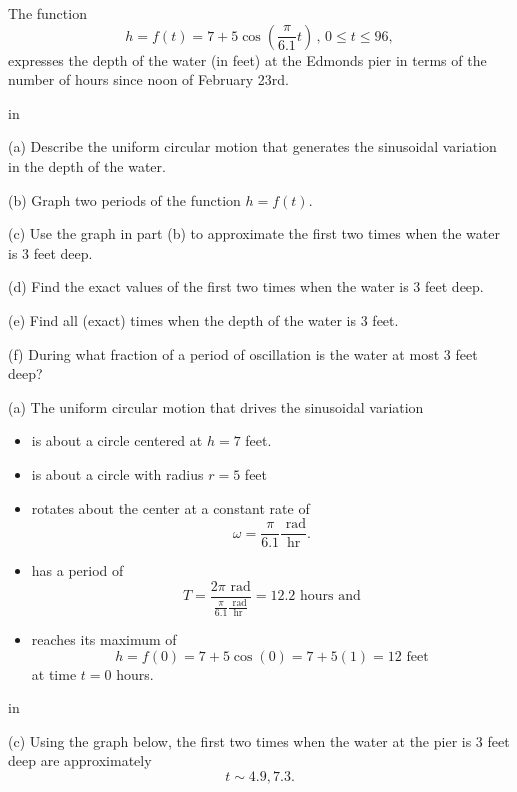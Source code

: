 \documentclass{ximera}
\newcommand{\pskip}{\vskip 0.1 in}
\begin{document}
\begin{example}  \label{Exer67u8gg}
The function
\[
    h  = f(t) = 7 + 5 \cos \left( \frac{\pi}{6.1}t  \right) \, , \, 0\leq t \leq 96 ,
\]
expresses the depth of the water (in feet) at the Edmonds pier in terms of the number of hours since noon of February 23rd.

\pskip

(a) Describe the uniform circular motion that generates the sinusoidal variation in the depth of the water.

(b) Graph two periods of the function $h=f(t)$.

(c) Use the graph in part (b) to approximate the first two times when the water is $3$ feet deep. 

(d) Find the exact values of the first two times when the water is $3$ feet deep.

(e) Find all (exact) times when the depth of the water is $3$ feet.

(f) During what fraction of a period of oscillation is the water at most $3$ feet deep?


\begin{explanation}
(a) The uniform circular motion that drives the sinusoidal variation

\begin{itemize}

\item{is about a circle centered at $h=7$ feet.}

\item{is about a circle with radius $r=5$ feet}

\item{rotates about the center at a constant rate of 
\[
     \omega = \frac{\pi}{6.1} \frac{ \text{ rad}}{\text{hr}} .
\]}

\item{has a period of
\[
   T =  \frac{2\pi \text{ rad}}{\frac{\pi}{6.1} \frac{ \text{ rad}}{\text{hr}}} = 12.2 \text{ hours and} 
\]}

\item{reaches its maximum of 
\[
   h  = f(0) = 7 + 5 \cos(0) = 7 + 5(1) = 12 \text{ feet}
\]
at time $t=0$ hours.}

\end{itemize}

\pskip

(c) Using the graph below, the first two times when the water at the pier is $3$ feet deep are approximately
\[
  t \sim 4.9, 7.3 .
\]

\end{explanation}
\end{example}
\end{document}
